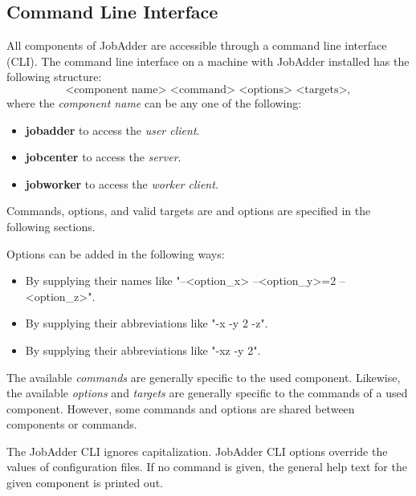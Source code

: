 \newcommand{\jacommand}[3]{

\textsc{\large{\textbf{#1}}}
\begin{itemize}
\item[\textbf{Options:}] #2
\item[\textbf{Effect:}] #3
\end{itemize}
}
\newcommand{\jaoption}[3]{
\begin{itemize}
\item[] \textbf{#1} (#2)
\item[\textbf{Effect:}] #3
\end{itemize}
}
\subsection{Command Line Interface}
All components of JobAdder are accessible through a command line interface (CLI).
The command line interface on a machine with JobAdder installed has the following structure:
\begin{equation}
\text{<component name> <command> <options> <targets>},
\end{equation}
where the \textit{component name} can be any one of the following:
\begin{itemize}
\item \textbf{jobadder} to access the \textit{user client}.
\item \textbf{jobcenter} to access the \textit{server}.
\item \textbf{jobworker} to access the \textit{worker client}.
\end{itemize}
Commands, options, and valid targets are and options are specified in the following sections.

Options can be added in the following ways:
\begin{itemize}
\item By supplying their names like "--<option\_x> --<option\_y>=2 --<option\_z>".
\item By supplying their abbreviations like "-x -y 2 -z".
\item By supplying their abbreviations like "-xz -y 2".
\end{itemize}

The available \textit{commands} are generally specific to the used component.
Likewise, the available \textit{options} and \textit{targets} are generally specific to the commands of a used component.
However, some commands and options are shared between components or commands.

The JobAdder CLI ignores capitalization.
JobAdder CLI options override the values of configuration files.
If no command is given, the general help text for the given component is printed out.
